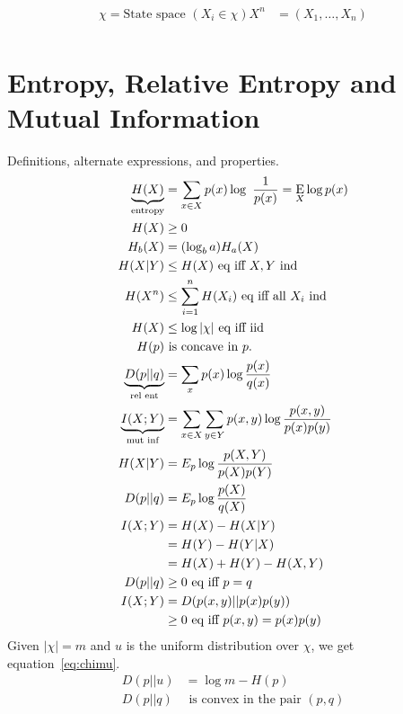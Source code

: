 \documentclass[10pt]{article}
\DeclareMathOperator*{\E}{\mbox{\text{E}}}
\begin{document}
\begin{scriptsize}
\begin{multicols}{3}

\begin{align*}
\chi = \text{State space } (X_i \in \chi)
X^n&=(X_1,\ldots,X_n) \\
\end{align*}

\section*{Entropy, Relative Entropy and Mutual Information}
Definitions, alternate expressions, and properties.
\begin{align}
    \underbrace{H(X)}_\text{entropy}&= \sum_{x\in X} p(x) \log\ \frac{1}{p(x)}
    = \E_X \log p(x) \label{defn: entropy}\\
H(X)& \geq 0 \\
H_b(X)&= (\log_b a)H_a(X) \\
H(X|Y)& \leq  H(X)\text{ eq iff $X,Y$ ind} \label{eq: H cond}\\
H(X^n)& \leq \sum_{i=1}^n H(X_i)\text{ eq iff all $X_i$ ind} \label{eq:jointsum}\\
H(X)&\leq  \log |\chi|  \text{ eq iff iid }\label{eq:alphabetentropy}\\
H(p)&\text{ is concave in $p$.}\\
\underbrace{D(p||q)}_\text{rel ent} & = \sum_x p(x) \log \frac{p(x)}{q(x)}\\
\underbrace{I(X;Y)}_\text{mut inf} & = \sum_{x\in X} \sum_{y \in Y} p(x,y) \log \frac{p(x,y)}{p(x)p(y)}\\
H(X|Y)&=E_p\log \frac{p(X,Y)}{p(X)p(Y)}\\
D(p||q)&=E_p\log \frac{p(X)}{q(X)}\\
I(X;Y)&=H(X)-H(X|Y)\\
&=H(Y)-H(Y|X)\\
&=H(X)+H(Y)-H(X,Y)\\
D(p||q)&\geq 0 \text{ eq iff $p=q$}\\
I(X;Y)&=D(p(x,y)||p(x)p(y))\\
	&\geq 0 \text{ eq iff $p(x,y)=p(x)p(y)$}
\end{align}
Given $|\chi|=m$ and $u$ is the uniform distribution over $\chi$, we get equation~\ref{eq:chimu}.
\begin{align}
D(p||u)&=\log m - H(p)\label{eq:chimu}\\
D(p||q)&\text{ is convex in the pair }(p,q)
\end{align}

\end{multicols}
\end{scriptsize}
\end{document}
